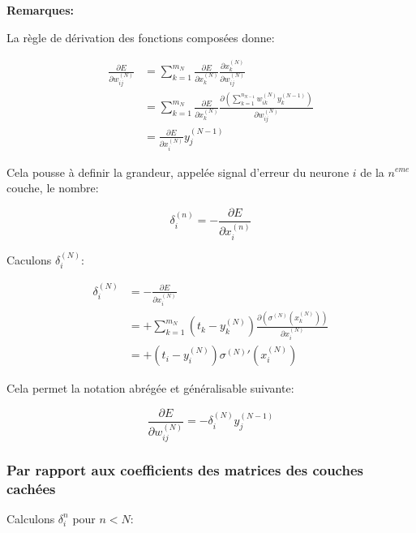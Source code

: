 \documentclass[11pt]{article}
\begin{document}
\textbf{Remarques:}

La règle de dérivation des fonctions composées donne:

\begin{align}
\frac{\partial E}{\partial w_{ij}^{(N)}}
& = \sum_{k=1}^{m_{N}}\frac{\partial E}{\partial x_{k}^{(N)}}
\frac{\partial x_{k}^{(N)}}{\partial w_{ij}^{(N)}}\\
& = \sum_{k=1}^{m_{N}}\frac{\partial E}{\partial x_{k}^{(N)}}
\frac{\partial (\sum_{k=1}^{n_{N-1}}w_{ik}^{(N)}y_{k}^{(N-1)})}
{\partial w_{ij}^{(N)}}\\
& = \frac{\partial E}{\partial x_{i}^{(N)}}y_{j}^{(N-1)}
\end{align}

Cela pousse à definir la grandeur, appelée signal d'erreur du neurone $i$ de la
$n^{eme}$ couche, le nombre:

\begin{equation}
\delta_{i}^{(n)}=-\frac{\partial E}{\partial x_{i}^{(n)}}
\end{equation}

Caculons $\delta_{i}^{(N)}$:

\begin{align}
\delta_{i}^{(N)}
& = -\frac{\partial E}{\partial x_{i}^{(N)}}\\
& = +\sum_{k=1}^{m_{N}}(t_{k}-y_{k}^{(N)})
\frac{\partial (\sigma^{(N)}(x_{k}^{(N)}))}{\partial x_{i}^{(N)}}\\
& = +(t_{i}-y_{i}^{(N)})\sigma^{(N)}'(x_{i}^{(N)})
\end{align}

Cela permet la notation abrégée et généralisable suivante:

\begin{equation}
\frac{\partial E}{\partial w_{ij}^{(N)}}
= -\delta_{i}^{(N)}y_{j}^{(N-1)}
\end{equation}

\subsubsection{Par rapport aux coefficients des matrices des couches cachées}
\label{sec-4-3-2}

Calculons $\delta_{i}^{n}$ pour $n<N$:
\end{document}
